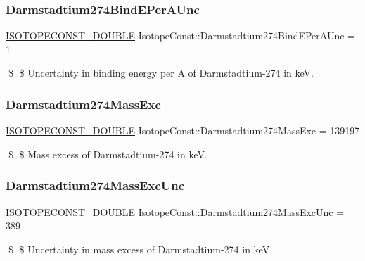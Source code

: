 \subsubsection{\texorpdfstring{Darmstadtium274\+Bind\+E\+Per\+A\+Unc}{Darmstadtium274BindEPerAUnc}}
{\footnotesize\ttfamily \mbox{\hyperlink{group___isotope_const-_macros_ga8f45a7272ce02c0b4c65c44636ed719a}{I\+S\+O\+T\+O\+P\+E\+C\+O\+N\+S\+T\+\_\+\+D\+O\+U\+B\+LE}} Isotope\+Const\+::\+Darmstadtium274\+Bind\+E\+Per\+A\+Unc = 1}

\$ \$ Uncertainty in binding energy per A of Darmstadtium-\/274 in keV. \mbox{\label{group___isotope_const-_darmstadtium-_ds274_ga3f0cf4dbb75b013c1da143f4be7356c8}} 
\subsubsection{\texorpdfstring{Darmstadtium274\+Mass\+Exc}{Darmstadtium274MassExc}}
{\footnotesize\ttfamily \mbox{\hyperlink{group___isotope_const-_macros_ga8f45a7272ce02c0b4c65c44636ed719a}{I\+S\+O\+T\+O\+P\+E\+C\+O\+N\+S\+T\+\_\+\+D\+O\+U\+B\+LE}} Isotope\+Const\+::\+Darmstadtium274\+Mass\+Exc = 139197}

\$ \$ Mass excess of Darmstadtium-\/274 in keV. \mbox{\label{group___isotope_const-_darmstadtium-_ds274_gab8fb6f314c5b624e770fc5093e4878c0}} 
\subsubsection{\texorpdfstring{Darmstadtium274\+Mass\+Exc\+Unc}{Darmstadtium274MassExcUnc}}
{\footnotesize\ttfamily \mbox{\hyperlink{group___isotope_const-_macros_ga8f45a7272ce02c0b4c65c44636ed719a}{I\+S\+O\+T\+O\+P\+E\+C\+O\+N\+S\+T\+\_\+\+D\+O\+U\+B\+LE}} Isotope\+Const\+::\+Darmstadtium274\+Mass\+Exc\+Unc = 389}

\$ \$ Uncertainty in mass excess of Darmstadtium-\/274 in keV. \mbox{\label{group___isotope_const-_darmstadtium-_ds274_gaadaef4bf80993086dd70d3dc3761705f}} 
